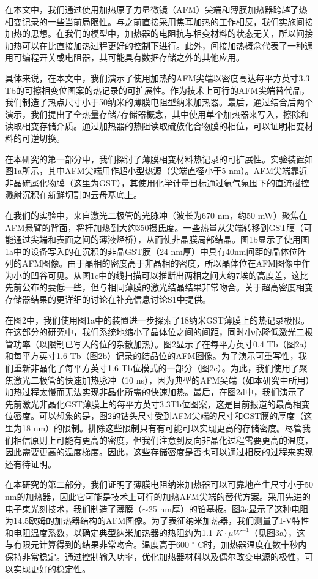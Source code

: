 在本文中，我们通过使用加热原子力显微镜（AFM）尖端和薄膜加热器跨越了热相变记录的一些当前局限性。与之前直接采用焦耳加热的工作相反，我们实施间接加热的思想。在我们的模型中，加热器的电阻抗与相变材料的状态无关，所以间接加热可以在比直接加热过程更好的控制下进行。此外，间接加热概念代表了一种通用可编程开关或电阻器，其可能具有数据存储之外的其他应用。

具体来说，在本文中，我们演示了使用加热的AFM尖端以密度高达每平方英寸3.3 Tb的可擦相变位图案的热记录的可扩展性。作为技术上可行的AFM尖端替代品，我们制造了热点尺寸小于50纳米的薄膜电阻型纳米加热器。最后，通过结合后两个演示，我们提出了全热量存储/存储器概念，其中使用单个加热器来写入，擦除和读取相变存储介质。通过加热器的热阻读取硫族化合物膜的相位，可以证明相变材料的可逆切换。

在本研究的第一部分中，我们探讨了薄膜相变材料热记录的可扩展性。实验装置如图1a所示，其中AFM尖端用作超小型热源（尖端直径小于5 nm）。AFM尖端靠近非晶硫属化物膜（这里为GST），其使用化学计量目标通过氩气氛围下的直流磁控溅射沉积在新鲜切割的云母基底上。

在我们的实验中，来自激光二极管的光脉冲（波长为670 nm，约50 mW）聚焦在AFM悬臂的背面，将杆加热到大约350摄氏度。一些热量从尖端转移到GST膜（可能通过尖端和表面之间的薄液烃桥），从而使非晶膜局部结晶。图1b显示了使用图1a中的设备写入的在沉积的非晶GST膜（24 nm厚）中具有40nm间距的晶体位阵列的AFM图像。由于晶相的密度高于非晶相的密度，所以晶体位在AFM图像中作为小的凹谷可见。从图1c中的线扫描可以推断出两相之间大约7埃的高度差，这比先前公布的要低一些，但与相同薄膜的激光结晶结果非常吻合。关于超高密度相变存储器结果的更详细的讨论在补充信息讨论S1中提供。

在图2中，我们使用图1a中的装置进一步探索了18纳米GST薄膜上的热记录极限。在这部分的研究中，我们系统地缩小了晶体位之间的间距，同时小心降低激光二极管功率（以限制已写入的位的杂散加热）。图2显示了在每平方英寸0.4 Tb（图2a）和每平方英寸1.6 Tb（图2b）记录的结晶位的AFM图像。为了演示可重写性，我们重新非晶化了每平方英寸1.6 Tb位模式的一部分（图2c）。为此，我们使用了聚焦激光二极管的快速加热脉冲（10 ns），因为典型的AFM尖端（如本研究中所用）加热过程太慢而无法实现非晶化所需的快速加热。最后，在图2d中，我们演示了先前激光非晶化GST薄膜上的每平方英寸3.3Tb位图案，这是目前报道的最高相变位密度。可以想象的是，图2的钻头尺寸受到AFM尖端的尺寸和GST膜的厚度（这里为18 nm）的限制。排除这些限制只有有可能可以实现更高的存储密度。尽管我们相信原则上可能有更高的密度，但我们注意到反向非晶化过程需要更高的温度，因此需要更高的温度梯度。因此，这些存储密度是否也可以通过相反的过程来实现还有待证明。

在本研究的第二部分，我们证明了薄膜电阻纳米加热器可以可靠地产生尺寸小于50 nm的加热器，因此它可能是技术上可行的加热AFM尖端的替代方案。采用先进的电子束光刻技术，我们制造了薄膜（$\sim$25 nm厚）的铂基板。图3c显示了这种电阻为14.5欧姆的加热器结构的AFM图像。为了表征纳米加热器，我们测量了I-V特性和电阻温度系数，以确定典型纳米加热器的热阻约为1.1 $K \cdot{} \mu W^{-1}$（见图3a），这与有限元计算得到的结果非常吻合。温度高于600 $^{\circ}$ C时，加热器温度在数十秒内保持非常稳定。通过控制输入功率，优化加热器材料以及偶尔改变电源的极性，可以实现更好的稳定性。


